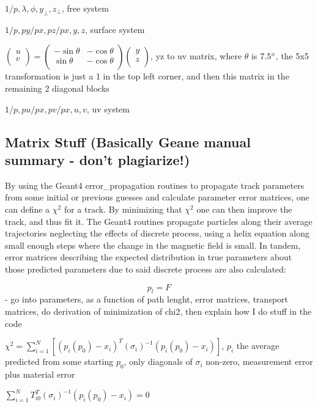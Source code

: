 \documentclass{article}
\begin{document}
$1/p, \lambda, \phi, y_{\perp}, z_{\perp}$, free system

$1/p, py/px, pz/px, y, z$, surface system

$
\begin{pmatrix}
u \\
v \\
\end{pmatrix} =
\begin{pmatrix}
-\sin{\theta} & -\cos{\theta} \\
\sin{\theta} & -\cos{\theta}\\
\end{pmatrix}
\begin{pmatrix}
y \\
z \\
\end{pmatrix}
$, yz to uv matrix, where $\theta$ is $7.5\degree$, the 5x5 transformation is just a 1 in the top left corner, and then this matrix in the remaining 2 diagonal blocks

$1/p, pu/px, pv/px, u, v$, uv system


\subsection{Matrix Stuff (Basically Geane manual summary - don't plagiarize!)}

By using the Geant4 error\_propagation routines to propagate track parameters from some initial or previous guesses and calculate parameter error matrices, one can define a $\chi^{2}$ for a track. By minimizing that $\chi^{2}$ one can then improve the track, and thus fit it. The Geant4 routines propagate particles along their average trajectories neglecting the effects of discrete process, using a helix equation along small enough steps where the change in the magnetic field is small. In tandem, error matrices describing the expected distribution in true parameters about those predicted parameters due to said discrete process are also calculated:

$$p_{l} = F$$ - go into parameters, as a function of path lenght, error matrices, transport matrices, do derivation of minimization of chi2, then explain how I do stuff in the code 


$\chi^2 = \sum_{i=1}^{N} [(p_{i}(p_{0})-x_{i})^{T}(\sigma_{i})^{-1}(p_{i}(p_{0})-x_{i})]$, $p_{i}$ the average predicted from some starting $p_{0}$, only diagonals of $\sigma_{i}$ non-zero, measurement error plus material error

$\sum_{i=1}^{N} T^{T}_{i0}(\sigma_{i})^{-1}(p_{i}(p_{0})-x_{i}) = 0$
\end{document}
